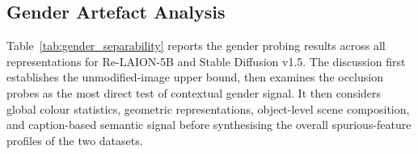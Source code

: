 \subsection{Gender Artefact Analysis}
\label{subsec:gender_artifact_analysis}

Table~\ref{tab:gender_separability} reports the gender probing results across all representations for Re-LAION-5B and Stable Diffusion v1.5. The discussion first establishes the unmodified-image upper bound, then examines the occlusion probes as the most direct test of contextual gender signal. It then considers global colour statistics, geometric representations, object-level scene composition, and caption-based semantic signal before synthesising the overall spurious-feature profiles of the two datasets.

